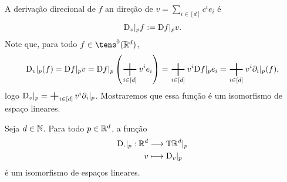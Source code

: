 A derivação direcional de $f$ an direção de $v=\sum_{i \in [d]} c^i e_i$ é
	\begin{equation*}
	\mathrm{D}_v|_p f := \mathrm{D} f|_p v.
	\end{equation*}
Note que, para todo $f \in \tens^0(\R^d)$,
	\begin{align*}
	\D_v|_p (f) = \D f|_p v = \D f|_p \left( \sum_{i \in [d]} v^ie_i \right)  = \sum_{i \in [d]} v^i \D f|_p e_i = \sum_{i \in [d]} v^i \partial_i|_p (f),
	\end{align*}
logo $\D_v|_p = \sum_{i \in [d]} v^i \partial_i|_p$. Mostraremos que essa função é um isomorfismo de espaço lineares.

\begin{prop}
Seja $d \in \mathbb{N}$. Para todo $p \in \mathbb{R}^d$, a função
	\begin{align*}
	{\mathrm{D}_{\bm{\cdot}}|_p}: {\mathbb{R}^d} &\longrightarrow {\mathrm{T}\mathbb{R}^d|_p} \\{v} &\longmapsto {\mathrm{D}_v|_p}
	\end{align*}
é um isomorfismo de espaços lineares.
\end{prop}
